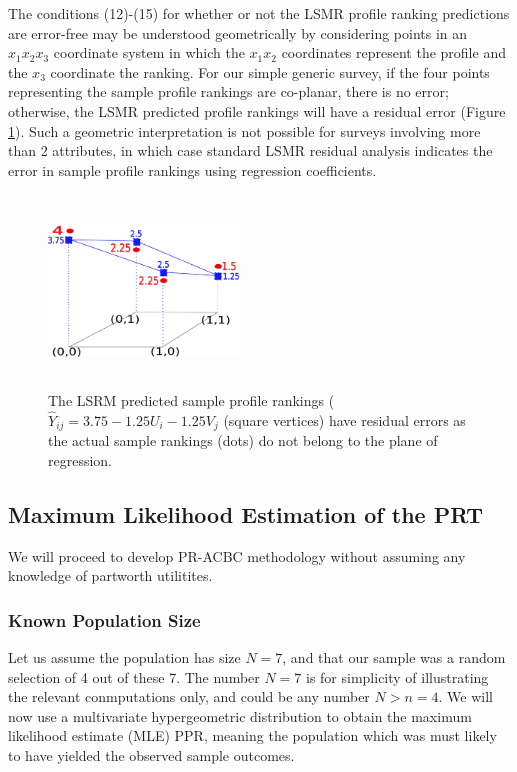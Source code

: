 \documentclass[a4paper, 12pt]{article}
\begin{document}
The conditions  (12)-(15) for whether or not the LSMR  profile ranking predictions are error-free may be understood geometrically by considering points in an $x_1x_2x_3$ coordinate system in which the $x_1x_2$ coordinates represent the profile and the $x_3$ coordinate the ranking. For our simple generic survey,  if the four points representing the sample profile rankings are co-planar, there is no error; otherwise, the LSMR predicted profile rankings will have a residual error (Figure  \ref{sec4fig}).  Such a geometric interpretation  is not possible for surveys involving more than 2 attributes, in which case standard LSMR residual analysis indicates the error in sample  profile rankings using regression coefficients.


\begin{figure}[!htpb]
	\centering
	\includegraphics[width=2in,height=2in]{sec4fig.png}
	\caption{{\small The LSRM predicted sample profile rankings ($\hat{Y}_{ij}=3.75-1.25U_i-1.25V_j$ (square vertices) have residual errors as the actual sample rankings (dots) do not belong to the plane of regression. }}	
	\label{sec4fig}
\end{figure}


\subsection{Maximum Likelihood Estimation of the PRT}
We will proceed to develop PR-ACBC methodology without assuming any knowledge of partworth utilitites.  
\subsubsection{Known Population Size}
Let us assume the population has size $N=7$, and that our sample was a random selection of 4 out of these 7. The number $N=7$ is for simplicity of illustrating the relevant conmputations only, and could be any number $N>n=4$.  We will now use a multivariate hypergeometric distribution to obtain the maximum likelihood estimate (MLE) PPR, meaning the population which was must likely to have yielded the observed sample outcomes.  
\end{document}
